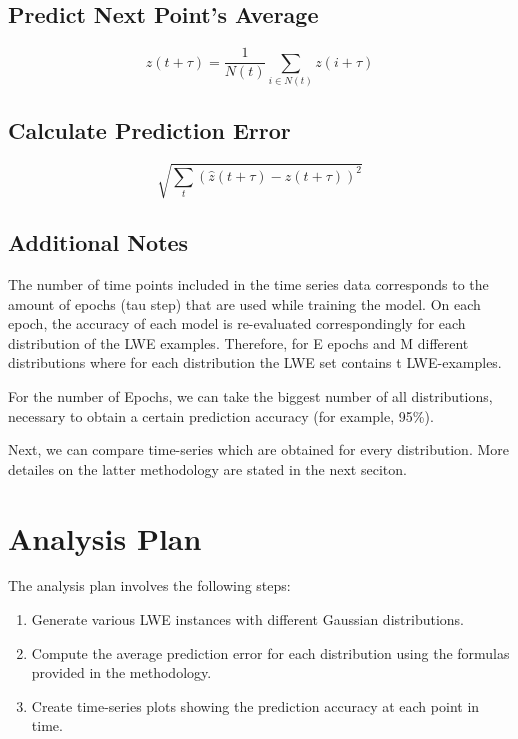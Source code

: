 \documentclass[12pt,a4paper]{article}
\begin{document}
\subsection{Predict Next Point's Average}
\begin{equation}
    \hat{z}(t + \tau) = \frac{1}{N(t)} \sum_{i \in N(t)} z(i + \tau)
\end{equation}

\subsection{Calculate Prediction Error}
\begin{equation}
    \sqrt{\sum_{t}\left(\hat{z}(t + \tau) - z(t + \tau)\right)^2}
\end{equation}

\subsection{Additional Notes}

The number of time points included in the time series data corresponds to the amount of epochs (tau step) that are used while training the model. On each epoch, the accuracy of each model is re-evaluated correspondingly for each distribution of the LWE examples. Therefore, for E epochs and M different distributions where for each distribution the LWE set contains t LWE-examples.

For the number of Epochs, we can take the biggest number of all distributions, necessary to obtain a certain prediction accuracy (for example, 95\%).

Next, we can compare time-series which are obtained for every distribution. More detailes on the latter methodology are stated in the next seciton.

\section{Analysis Plan}
The analysis plan involves the following steps:

\begin{enumerate}
    \item Generate various LWE instances with different Gaussian distributions.
    \item Compute the average prediction error for each distribution using the formulas provided in the methodology.
    \item Create time-series plots showing the prediction accuracy at each point in time.
\end{enumerate}
\end{document}
